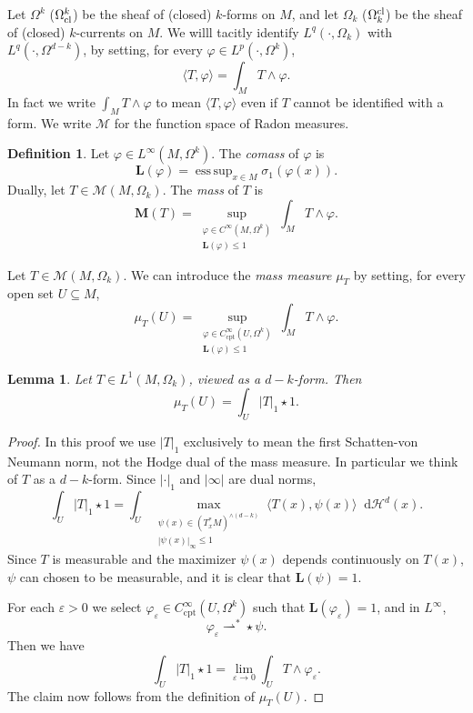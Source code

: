 \documentclass[reqno,11pt]{amsart}
\newcommand*\dif{\mathop{}\!\mathrm{d}}
\newcommand{\Mass}{\mathbf M}
\newcommand{\Comass}{\mathbf L}
\newcommand{\weakto}{\rightharpoonup}
\newcommand{\dfn}[1]{\emph{#1}\index{#1}}
\newcommand{\cpt}{\mathrm{cpt}}
\newtheorem{lemma}[theorem]{Lemma}
\theoremstyle{definition}
\newtheorem{definition}[theorem]{Definition}
\DeclareMathOperator*{\esssup}{ess\,sup}
\numberwithin{equation}{section}
\begin{document}
Let $\Omega^k$ ($\Omega^k_{\rm cl}$) be the sheaf of (closed) $k$-forms on $M$, and let $\Omega_k$ ($\Omega^{\rm cl}_k$) be the sheaf of (closed) $k$-currents on $M$.
We willl tacitly identify $L^q(\cdot, \Omega_k)$ with $L^q(\cdot, \Omega^{d - k})$, by setting, for every $\varphi \in L^p(\cdot, \Omega^k)$,
$$\langle T, \varphi\rangle = \int_M T \wedge \varphi.$$
In fact we write $\int_M T \wedge \varphi$ to mean $\langle T, \varphi\rangle$ even if $T$ cannot be identified with a form.
We write $\mathcal M$ for the function space of Radon measures.

\begin{definition}
Let $\varphi \in L^\infty(M, \Omega^k)$. The \dfn{comass} of $\varphi$ is 
\begin{equation}\label{infinity norm gives comass}
\Comass(\varphi) = \esssup_{x \in M} \sigma_1(\varphi(x)).
\end{equation}
Dually, let $T \in \mathcal M(M, \Omega_k)$. The \dfn{mass} of $T$ is 
$$\Mass(T) = \sup_{\substack{\varphi \in C^\infty(M, \Omega^k) \\ \Comass(\varphi) \leq 1}} \int_M T \wedge \varphi.$$
\end{definition}

Let $T \in \mathcal M(M, \Omega_k)$.
We can introduce the \dfn{mass measure} $\mu_T$ by setting, for every open set $U \subseteq M$,
$$\mu_T(U) = \sup_{\substack{\varphi \in C^\infty_\cpt(U, \Omega^k) \\ \Comass(\varphi) \leq 1}} \int_M T \wedge \varphi.$$

\begin{lemma}\label{formula for mass measure}
Let $T \in L^1(M, \Omega_k)$, viewed as a $d - k$-form. Then 
$$\mu_T(U) = \int_U |T|_1 \star 1.$$
\end{lemma}
\begin{proof}
In this proof we use $|T|_1$ exclusively to mean the first Schatten-von Neumann norm, not the Hodge dual of the mass measure.
In particular we think of $T$ as a $d - k$-form.
Since $|\cdot|_1$ and $|\infty|$ are dual norms,
$$\int_U |T|_1 \star 1 = \int_U \max_{\substack{\psi(x) \in (T^*_x M)^{\wedge (d - k)} \\ |\psi(x)|_\infty \leq 1}} \langle T(x), \psi(x)\rangle \dif \mathcal H^d(x).$$
Since $T$ is measurable and the maximizer $\psi(x)$ depends continuously on $T(x)$, $\psi$ can chosen to be measurable, and it is clear that $\Comass(\psi) = 1$.

For each $\varepsilon > 0$ we select $\varphi_\varepsilon \in C^\infty_\cpt(U, \Omega^k)$ such that $\Comass(\varphi_\varepsilon) = 1$, and in $L^\infty$,
$$\varphi_\varepsilon \weakto^* \star \psi.$$
Then we have
$$\int_U |T|_1 \star 1 = \lim_{\varepsilon \to 0} \int_U T \wedge \varphi_\varepsilon.$$
The claim now follows from the definition of $\mu_T(U)$.
\end{proof}
\end{document}
